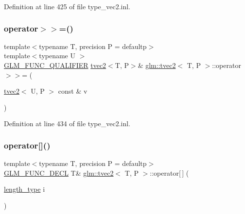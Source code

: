 Definition at line 425 of file type\+\_\+vec2.\+inl.

\mbox{\label{structglm_1_1tvec2_a6c2dc839f420cba67d7c0dfaab196081}} 
\subsubsection{\texorpdfstring{operator$>$$>$=()}{operator>>=()}\hspace{0.1cm}{\footnotesize\ttfamily [6/6]}}
{\footnotesize\ttfamily template$<$typename T, precision P = defaultp$>$ \\
template$<$typename U $>$ \\
\mbox{\hyperlink{setup_8hpp_a33fdea6f91c5f834105f7415e2a64407}{G\+L\+M\+\_\+\+F\+U\+N\+C\+\_\+\+Q\+U\+A\+L\+I\+F\+I\+ER}} \mbox{\hyperlink{structglm_1_1tvec2}{tvec2}}$<$T, P$>$\& \mbox{\hyperlink{structglm_1_1tvec2}{glm\+::tvec2}}$<$ T, P $>$\+::operator$>$$>$= (\begin{DoxyParamCaption}\item[{\mbox{\hyperlink{structglm_1_1tvec2}{tvec2}}$<$ U, P $>$ const \&}]{v }\end{DoxyParamCaption})}



Definition at line 434 of file type\+\_\+vec2.\+inl.

\mbox{\label{structglm_1_1tvec2_a70383ca2702ecf4d4ff41063de68594d}} 
\subsubsection{\texorpdfstring{operator[]()}{operator[]()}\hspace{0.1cm}{\footnotesize\ttfamily [1/2]}}
{\footnotesize\ttfamily template$<$typename T, precision P = defaultp$>$ \\
\mbox{\hyperlink{setup_8hpp_ab2d052de21a70539923e9bcbf6e83a51}{G\+L\+M\+\_\+\+F\+U\+N\+C\+\_\+\+D\+E\+CL}} T\& \mbox{\hyperlink{structglm_1_1tvec2}{glm\+::tvec2}}$<$ T, P $>$\+::operator\mbox{[}$\,$\mbox{]} (\begin{DoxyParamCaption}\item[{\mbox{\hyperlink{structglm_1_1tvec2_a5a5ddebab821a3cf9185772386afbe8d}{length\+\_\+type}}}]{i }\end{DoxyParamCaption})}

